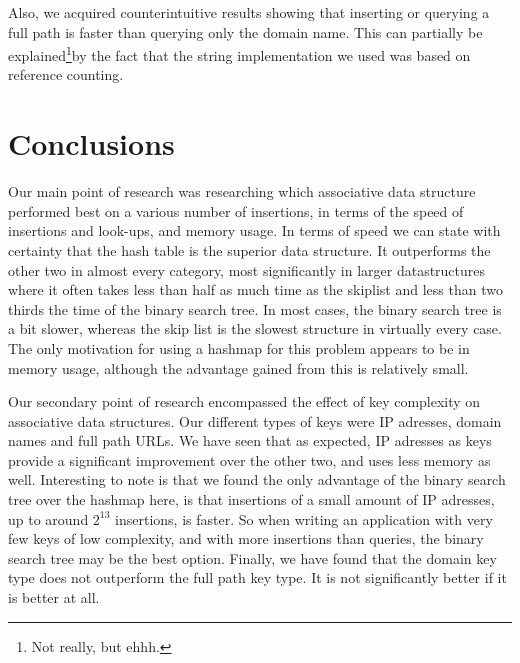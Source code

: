 \documentclass[12pt,a4paper]{article}
\begin{document}
    Also, we acquired counterintuitive results showing that inserting or querying a full path is
    faster than querying only the domain name.  This can partially be explained\footnote{Not really,
    but ehhh.}by the fact that the string implementation we used was based on reference counting.

    \section{Conclusions}
    Our main point of research was researching which associative data structure performed best on
    a various number of insertions, in terms of the speed of insertions and look-ups, and memory usage.
    In terms of speed we can state with certainty that the hash table is the superior data structure.
    It outperforms the other two in almost every category, most significantly in larger datastructures where
    it often takes less than half as much time as the skiplist and less than two thirds the time of the binary search tree.
    In most cases, the binary search tree is a bit slower, whereas the skip list is the slowest structure in
    virtually every case. The only motivation for using a hashmap for this problem appears to be in memory usage,
    although the advantage gained from this is relatively small.
    
    Our secondary point of research encompassed the effect of key complexity on associative data structures.
    Our different types of keys were IP adresses, domain names and full path URLs. We have seen that as expected,
    IP adresses as keys provide a significant improvement over the other two, and uses less memory as well. Interesting to
    note is that we found the only advantage of the binary search tree over the hashmap here, is that insertions of
    a small amount of IP adresses, up to around $2^13$ insertions, is faster. So when writing an application with very
    few keys of low complexity, and with more insertions than queries, the binary search tree may be the best option. Finally,
    we have found that the domain key type does not outperform the full path key type. It is not significantly better
    if it is better at all.
    
\end{document}

